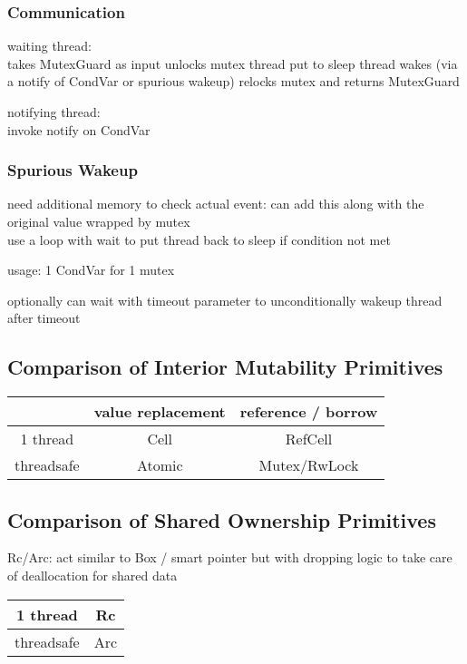 \documentclass[8pt]{extarticle}
\begin{document}
\begin{multicols*}{2}
  \subsubsection{Communication}
  waiting thread:\\
  takes MutexGuard as input
  unlocks mutex
  thread put to sleep
  thread wakes (via a notify of CondVar or spurious wakeup)
  relocks mutex and returns MutexGuard

  notifying thread:\\
  invoke notify on CondVar

  \subsubsection{Spurious Wakeup}
  need additional memory to check actual event: can add this along with the original value wrapped by mutex\\
  use a loop with wait to put thread back to sleep if condition not met
  
  usage: 1 CondVar for 1 mutex

  optionally can wait with timeout parameter to unconditionally wakeup thread after timeout

  \subsection{Comparison of Interior Mutability Primitives}
  \begin{tabular}{| c | c | c |}
    \hline
    & value replacement & reference / borrow \\
    \hline
    1  thread & Cell & RefCell \\
    \hline
    threadsafe & Atomic & Mutex/RwLock \\
    \hline
  \end{tabular}

  \subsection{Comparison of Shared Ownership Primitives}
  Rc/Arc: act similar to Box / smart pointer but with dropping logic to take care of deallocation for shared data\\
  
  \begin{tabular}{| c | c |}
    \hline
    1  thread & Rc \\
    \hline
    threadsafe & Arc \\
    \hline
  \end{tabular}
  

\end{multicols*}
\end{document}
